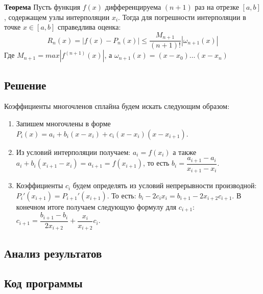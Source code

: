 \textbf{Теорема}{
	Пусть функция $f(x)$ дифференцируема $(n+1)$ раз на отрезке $[a, b]$, содержащем узлы интерполяции $x_i$. Тогда для погрешности интерполяции в точке $x \in [a, b]$ справедлива оценка:
	\[
		R_n(x) = |f(x) - P_n(x)| \leq \dfrac{M_{n+1}}{(n+1)!}|\omega_{n+1}(x)|
	\]
	Где $M_{n+1} = max|f^{(n+1)}(x)|$, а $\omega_{n+1}(x) = (x - x_0)\dots(x - x_n)$
}

\subsection*{Решение}

Коэффициенты многочленов сплайна будем искать следующим образом:

\begin{enumerate}
	\item Запишем многочлены в форме $P_i(x) = a_i + b_i(x - x_i) + c_i(x - x_i)(x - x_{i+1})$.
	\item Из условий интерполяции получаем: $a_i = f(x_i)$ а также $a_i + b_i(x_{i+1} - x_i) = a_{i+1} = f(x_{i+1})$, то есть $b_i = \dfrac{a_{i+1} - a_i}{x_{i+1} - x_i}$.
	\item Коэффициенты $c_i$ будем определять из условий непрерывности производной: $P_i'(x_{i+1}) = P_{i+1}'(x_{i+1})$. То есть: $b_i - 2c_ix_i = b_{i+1} - 2x_{i+2}c_{i+1}$. В конечном итоге получаем следующую формулу для $c_{i+1}$: $c_{i+1} = \dfrac{b_{i+1} - b_i}{2x_{i+2}} + \dfrac{x_i}{x_{i+2}}c_i$.
\end{enumerate}

\subsection*{Анализ результатов}
\subsection*{Код программы}

